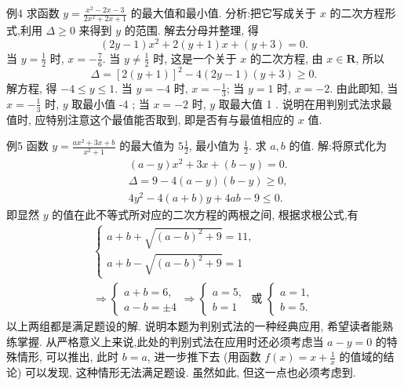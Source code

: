 例4 求函数 $y=\frac{x^2-2 x-3}{2 x^2+2 x+1}$ 的最大值和最小值.
分析:把它写成关于 $x$ 的二次方程形式,利用 $\Delta \geqslant 0$ 来得到 $y$ 的范围.
解去分母并整理, 得
$$
(2 y-1) x^2+2(y+1) x+(y+3)=0 .
$$
当 $y=\frac{1}{2}$ 时, $x=-\frac{7}{6}$.
当 $y \neq \frac{1}{2}$ 时, 这是一个关于 $x$ 的二次方程, 由 $x \in \mathbf{R}$, 所以
$$
\Delta=[2(y+1)]^2-4(2 y-1)(y+3) \geqslant 0 .
$$
解方程, 得 $-4 \leqslant y \leqslant 1$.
当 $y=-4$ 时, $x=-\frac{1}{3}$; 当 $y=1$ 时, $x=-2$.
由此即知, 当 $x=-\frac{1}{3}$ 时, $y$ 取最小值 -4 ; 当 $x=-2$ 时, $y$ 取最大值 1 .
说明在用判别式法求最值时, 应特别注意这个最值能否取到, 即是否有与最值相应的 $x$ 值.



例5 函数 $y=\frac{a x^2+3 x+b}{x^2+1}$ 的最大值为 $5 \frac{1}{2}$, 最小值为 $\frac{1}{2}$. 求 $a, b$ 的值.
解:将原式化为
$$
\begin{aligned}
& (a-y) x^2+3 x+(b-y)=0 . \\
& \Delta=9-4(a-y)(b-y) \geqslant 0, \\
& 4 y^2-4(a+b) y+4 a b-9 \leqslant 0 .
\end{aligned}
$$
即显然 $y$ 的值在此不等式所对应的二次方程的两根之间, 根据求根公式,有
$$
\begin{gathered}
\left\{\begin{array}{l}
a+b+\sqrt{(a-b)^2+9}=11, \\
a+b-\sqrt{(a-b)^2+9}=1
\end{array}\right. \\
\Rightarrow\left\{\begin{array} { l } 
{ a + b = 6 , } \\
{ a - b = \pm 4 }
\end{array} \Rightarrow \left\{\begin{array} { l } 
{ a = 5 , } \\
{ b = 1 }
\end{array} \text { 或 } \left\{\begin{array}{l}
a=1, \\
b=5 .
\end{array}\right.\right.\right.
\end{gathered}
$$
以上两组都是满足题设的解.
说明本题为判别式法的一种经典应用, 希望读者能熟练掌握.
从严格意义上来说,此处的判别式法在应用时还必须考虑当 $a-y=0$ 的特殊情形, 可以推出, 此时 $b=a$, 进一步推下去 (用函数 $f(x)=x+\frac{1}{x}$ 的值域的结论) 可以发现, 这种情形无法满足题设.
虽然如此, 但这一点也必须考虑到.



